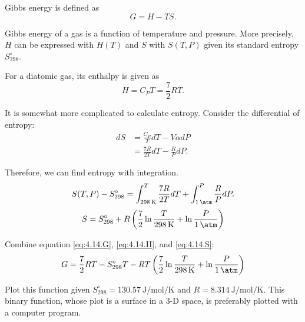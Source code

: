\begin{@empty}
\begin{answer}
    Gibbs energy is defined as
    \begin{equation}
        G = H - TS. \label{eq:4.14.G}
    \end{equation}

    Gibbs energy of a gas is a function of temperature and pressure.  More
    precisely, $H$ can be expressed with $H(T)$ and $S$ with $S(T, P)$ given
    its standard entropy $S_{298}^\circ$.

    For a diatomic gas, its enthalpy is given as
    \begin{equation}
        H = C_P T = \frac72 RT. \label{eq:4.14.H}
    \end{equation}

    It is somewhat more complicated to calculate entropy.  Consider the
    differential of entropy:
    \begin{align*}
        dS &= \frac{C_P}{T} dT - V\alpha dP \\
        &= \frac{7R}{2T} dT - \frac{R}{P} dP.
    \end{align*}

    Therefore, we can find entropy with integration.
    \[ S(T, P) - S_{298}^\circ = \int_{\SI{298}{\kelvin}}^T \frac{7R}{2T} dT + \int_{\SI{1}{\atm}}^P \frac{R}{P} dP.\]
    \begin{equation}
        S = S_{298}^\circ + R \left( \frac72 \ln\frac{T}{\SI{298}{\kelvin}} + \ln\frac{P}{\SI{1}{\atm}} \right)
        \label{eq:4.14.S}
    \end{equation}

    Combine equation \eqref{eq:4.14.G}, \eqref{eq:4.14.H}, and
    \eqref{eq:4.14.S}:
    \[ G = \frac72 RT - S_{298}^\circ T - RT \left( \frac72 \ln\frac{T}{\SI{298}{\kelvin}} + \ln\frac{P}{\SI{1}{\atm}} \right) \]

    Plot this function given $S_{298}^\circ = \SI{130.57}{\joule\per\mol\per\kelvin}$
    and $R = \SI{8.314}{\joule\per\mol\per\kelvin}$.  This binary function,
    whose plot is a surface in a 3-D space, is preferably plotted with a
    computer program.
\end{answer}
\end{@empty}
